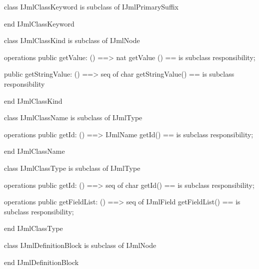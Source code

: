 \begin{vdm_al}
class IJmlClassKeyword
 is subclass of IJmlPrimarySuffix

end IJmlClassKeyword
\end{vdm_al}

\begin{vdm_al}
class IJmlClassKind
 is subclass of IJmlNode

operations
  public getValue: () ==> nat
  getValue () == is subclass responsibility;

  public getStringValue: () ==> seq of char
  getStringValue() == is subclass responsibility

end IJmlClassKind
\end{vdm_al}

\begin{vdm_al}
class IJmlClassName
 is subclass of IJmlType

operations
  public getId: () ==> IJmlName
  getId() == is subclass responsibility;

end IJmlClassName
\end{vdm_al}

\begin{vdm_al}
class IJmlClassType
 is subclass of IJmlType

operations
  public getId: () ==> seq of char
  getId() == is subclass responsibility;

operations
  public getFieldList: () ==> seq of IJmlField
  getFieldList() == is subclass responsibility;

end IJmlClassType
\end{vdm_al}

\begin{vdm_al}
class IJmlDefinitionBlock
 is subclass of IJmlNode

end IJmlDefinitionBlock
\end{vdm_al}

